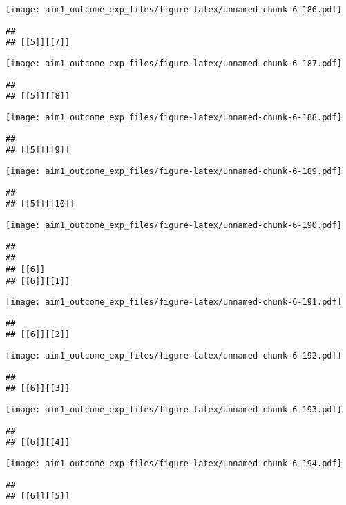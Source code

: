 \documentclass[
]{article}
\begin{document}
\texttt{[image: aim1\_outcome\_exp\_files/figure-latex/unnamed-chunk-6-186.pdf]}

\begin{verbatim}
## 
## [[5]][[7]]
\end{verbatim}

\texttt{[image: aim1\_outcome\_exp\_files/figure-latex/unnamed-chunk-6-187.pdf]}

\begin{verbatim}
## 
## [[5]][[8]]
\end{verbatim}

\texttt{[image: aim1\_outcome\_exp\_files/figure-latex/unnamed-chunk-6-188.pdf]}

\begin{verbatim}
## 
## [[5]][[9]]
\end{verbatim}

\texttt{[image: aim1\_outcome\_exp\_files/figure-latex/unnamed-chunk-6-189.pdf]}

\begin{verbatim}
## 
## [[5]][[10]]
\end{verbatim}

\texttt{[image: aim1\_outcome\_exp\_files/figure-latex/unnamed-chunk-6-190.pdf]}

\begin{verbatim}
## 
## 
## [[6]]
## [[6]][[1]]
\end{verbatim}

\texttt{[image: aim1\_outcome\_exp\_files/figure-latex/unnamed-chunk-6-191.pdf]}

\begin{verbatim}
## 
## [[6]][[2]]
\end{verbatim}

\texttt{[image: aim1\_outcome\_exp\_files/figure-latex/unnamed-chunk-6-192.pdf]}

\begin{verbatim}
## 
## [[6]][[3]]
\end{verbatim}

\texttt{[image: aim1\_outcome\_exp\_files/figure-latex/unnamed-chunk-6-193.pdf]}

\begin{verbatim}
## 
## [[6]][[4]]
\end{verbatim}

\texttt{[image: aim1\_outcome\_exp\_files/figure-latex/unnamed-chunk-6-194.pdf]}

\begin{verbatim}
## 
## [[6]][[5]]
\end{verbatim}
\end{document}
